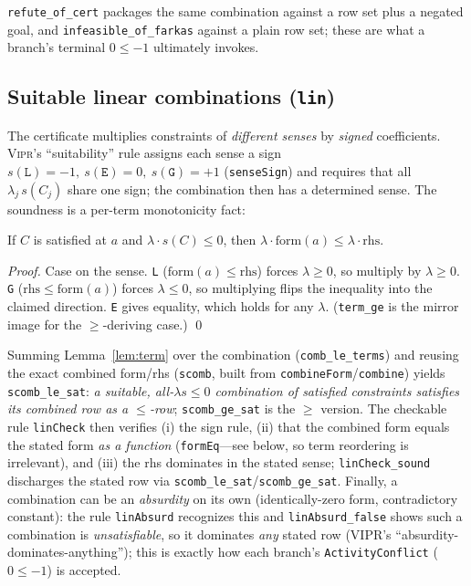 \documentclass[runningheads]{llncs}
\newcommand{\code}[1]{\texttt{#1}}
\newcommand{\vipr}{\textsc{Vipr}}
\begin{document}
\code{refute\_of\_cert} packages the same combination against a row set plus a negated
goal, and \code{infeasible\_of\_farkas} against a plain row set; these are what a
branch's terminal $0\le-1$ ultimately invokes.

\subsection{Suitable linear combinations (\code{lin})}\label{sec:calc-lin}
The certificate multiplies constraints of \emph{different senses} by \emph{signed}
coefficients. \vipr{}'s ``suitability'' rule assigns each sense a sign
$s(\code{L}){=}-1,\ s(\code{E}){=}0,\ s(\code{G}){=}+1$ (\code{senseSign}) and requires
that all $\lambda_j\, s(C_j)$ share one sign; the combination then has a determined
sense. The soundness is a per-term monotonicity fact:

\begin{lemma}[\code{term\_le}]\label{lem:term}
If $C$ is satisfied at $a$ and $\lambda\cdot s(C)\le0$, then
$\lambda\cdot\mathrm{form}(a)\le\lambda\cdot\mathrm{rhs}$.
\end{lemma}
\begin{proof}
Case on the sense. \code{L} ($\mathrm{form}(a)\le\mathrm{rhs}$) forces $\lambda\ge0$, so
multiply by $\lambda\ge0$. \code{G} ($\mathrm{rhs}\le\mathrm{form}(a)$) forces
$\lambda\le0$, so multiplying flips the inequality into the claimed direction. \code{E}
gives equality, which holds for any $\lambda$. (\code{term\_ge} is the mirror image for
the $\ge$-deriving case.) \qed
\end{proof}

Summing Lemma~\ref{lem:term} over the combination (\code{comb\_le\_terms}) and reusing
the exact combined form/rhs (\code{scomb}, built from \code{combineForm}/\code{combine})
yields \code{scomb\_le\_sat}: \emph{a suitable, all-$\lambda s\le0$ combination of
satisfied constraints satisfies its combined row as a $\le$-row}; \code{scomb\_ge\_sat}
is the $\ge$ version. The checkable rule \code{linCheck} then verifies (i) the sign rule,
(ii) that the combined form equals the stated form \emph{as a function}
(\code{formEq}---see below, so term reordering is irrelevant), and (iii) the rhs
dominates in the stated sense; \code{linCheck\_sound} discharges the stated row via
\code{scomb\_le\_sat}/\code{scomb\_ge\_sat}. Finally, a combination can be an
\emph{absurdity} on its own (identically-zero form, contradictory constant): the rule
\code{linAbsurd} recognizes this and \code{linAbsurd\_false} shows such a combination is
\emph{unsatisfiable}, so it dominates \emph{any} stated row (VIPR's
``absurdity-dominates-anything''); this is exactly how each branch's
\code{ActivityConflict} ($0\le-1$) is accepted.
\end{document}
